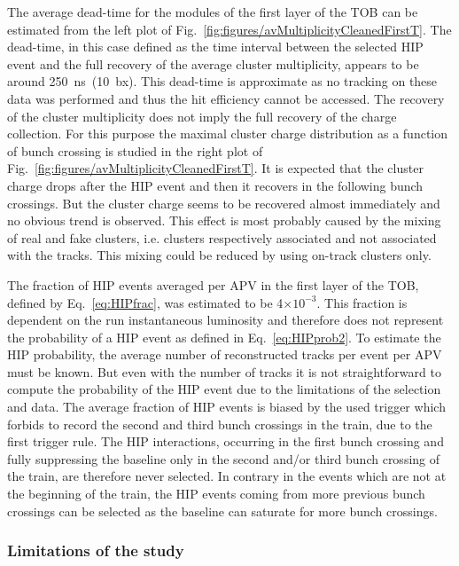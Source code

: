 The average dead-time for the modules of the first layer of the TOB can be estimated from the left plot of Fig.~\ref{fig:figures/avMultiplicityCleanedFirstT}. The dead-time, in this case defined as the time interval between the selected HIP event and the full recovery of the average cluster multiplicity, appears to be around 250~ns~(10~bx). This dead-time is approximate as no tracking on these data was performed and thus the hit efficiency cannot be accessed. The recovery of the cluster multiplicity does not imply the full recovery of the charge collection. For this purpose the maximal cluster charge distribution as a function of bunch crossing is studied in the right plot of Fig.~\ref{fig:figures/avMultiplicityCleanedFirstT}. It is expected that the cluster charge drops after the HIP event and then it recovers in the following bunch crossings. But the cluster charge seems to be recovered almost immediately and no obvious trend is observed. This effect is most probably caused by the mixing of real and fake clusters, i.e. clusters respectively associated and not associated with the tracks. This mixing could be reduced by using on-track clusters only.

The fraction of HIP events averaged per APV in the first layer of the TOB, defined by Eq.~\ref{eq:HIPfrac}, was estimated to be 4$\times 10^{-3}$. This fraction is dependent on the run instantaneous luminosity and therefore does not represent the probability of a HIP event as defined in Eq.~\ref{eq:HIPprob2}. To estimate the HIP probability, the average number of reconstructed tracks per event per APV must be known. But even with the number of tracks it is not straightforward to compute the probability of the HIP event due to the limitations of the selection and data. The average fraction of HIP events is biased by the used trigger which forbids to record the second and third bunch crossings in the train, due to the first trigger rule. The HIP interactions, occurring in the first bunch crossing and fully suppressing the baseline only in the second and/or third bunch crossing of the train, are therefore never selected. In contrary in the events which are not at the beginning of the train, the HIP events coming from more previous bunch crossings can be selected as the baseline can saturate for more bunch crossings.
 

\subsubsection{Limitations of the study~\label{sec:limitationsSelection}}

